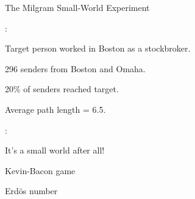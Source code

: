 \begin{frame}{The Milgram Small-World Experiment}
	
:

\BI
\item Target person worked in Boston as a stockbroker.
\item 296 senders from Boston and Omaha.
\item 20\% of senders reached target.
\item Average path length = 6.5.
\EI

\bigskip
{}:

\BI
\item It's a small world after all!
\item Kevin-Bacon game
\item Erd\"os number
\EI

\end{frame}

